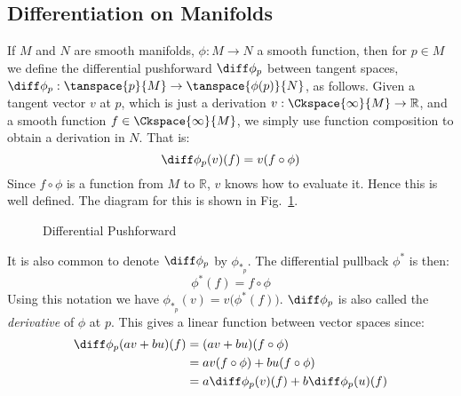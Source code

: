 \documentclass{book}                                                           %
\begin{document}
            \subsection{Differentiation on Manifolds}
                If $M$ and $N$ are smooth manifolds, $\phi:M\rightarrow{N}$ a
                smooth function, then for $p\in{M}$ we define the differential
                pushforward $\diff\phi_{p}$ between tangent spaces,
                $\diff\phi_{p}:\tanspace{p}{M}\rightarrow\tanspace{\phi(p)}{N}$,
                as follows. Given a tangent vector $v$ at $p$, which is just a
                derivation $v:\Ckspace{\infty}{M}\rightarrow\mathbb{R}$, and a
                smooth function $f\in\Ckspace{\infty}{M}$, we simply use
                function composition to obtain a derivation in $N$. That is:
                \begin{equation}
                    \diff\phi_{p}(v)(f)=v(f\circ\phi)
                \end{equation}
                Since $f\circ\phi$ is a function from $M$ to $\mathbb{R}$, $v$
                knows how to evaluate it. Hence this is well defined. The
                diagram for this is shown in
                Fig.~\ref{fig:Differential_Pushforward}.
                \begin{figure}[H]
                    \centering
                    \captionsetup{type=figure}
                    
                    \caption{Differential Pushforward}
                    \label{fig:Differential_Pushforward}
                \end{figure}
                It is also common to denote $\diff\phi_{p}$ by
                $\phi_{*_{p}}$. The differential pullback $\phi^{*}$ is then:
                \begin{equation}
                    \phi^{*}(f)=f\circ\phi
                \end{equation}
                Using this notation we have
                $\phi_{*_{p}}(v)=v\big(\phi^{*}(f)\big)$. $\diff\phi_{p}$ is
                also called the \textit{derivative} of $\phi$ at $p$. This gives
                a linear function between vector spaces since:
                \begin{subequations}
                    \begin{align}
                        \diff\phi_{p}(av+bu)(f)&=(av+bu)(f\circ\phi)\\
                        &=av(f\circ\phi)+bu(f\circ\phi)\\
                        &=a\diff\phi_{p}(v)(f)+b\diff\phi_{p}(u)(f)
                    \end{align}
                \end{subequations}
\end{document}
